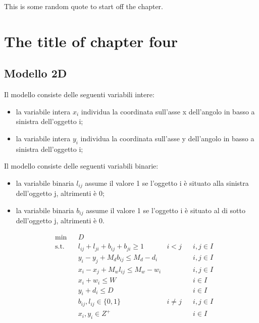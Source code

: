 \begin{savequote}[75mm]
This is some random quote to start off the chapter.
\end{savequote}

\chapter{The title of chapter four}
\label{chap:four}

\section{Modello 2D}
Il modello consiste delle seguenti variabili intere:
\begin{itemize}
    \item la variabile intera $x_{i}$ individua la coordinata sull'asse x dell'angolo in basso a sinistra dell'oggetto i;
    \item la variabile intera $y_{i}$ individua la coordinata sull'asse y dell'angolo in basso a sinistra dell'oggetto i;
\end{itemize}
Il modello consiste delle seguenti variabili binarie:
\begin{itemize}
    \item la variabile binaria $l_{ij}$ assume il valore 1 se l'oggetto i è situato alla sinistra dell'oggetto j, altrimenti è 0;
    \item la variabile binaria $b_{ij}$ assume il valore 1 se l'oggetto i è situato al di sotto dell'oggetto j, altrimenti è 0.
\end{itemize}

\begin{equation*}
    \begin{aligned}
    & \underset{}{\text{min}}
    & & D \\
    & \text{s.t.} & &  l_{ij} + l_{ji} + b_{ij} + b_{ji} \geq 1 & i < j & & i,j \in I \\
    & & & y_i - y_j + M_d b_{ij} \leq M_d - d_i & & & i,j \in I \\
    & & & x_i - x_j + M_w l_{ij} \leq M_w - w_i & & & i,j \in I \\
    & & & x_i + w_i \leq W & & & i \in I \\
    & & & y_i + d_i \leq D & & & i \in I \\
    & & & b_{ij}, l_{ij} \in \{0,1\} & i \neq j & & i,j \in I \\
    & & & x_{i}, y_{i} \in Z^{+} & & & i \in I \\
    \end{aligned}
\end{equation*}

